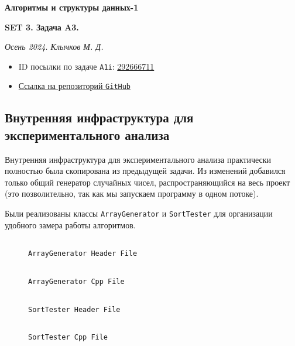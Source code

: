 \documentclass[11pt,a4paper]{scrarticle}
\author{Клычков Максим Дмитриевич}
\theoremstyle{definition}
\begin{document}
\centerline{\textbf{\huge Алгоритмы и структуры данных-1}}
\centerline{\textbf{SET 3. Задача A3.}}
\begin{flushright}
	\emph{Осень 2024. Клычков М. Д.}
\end{flushright}

\begin{itemize}
	\item ID посылки по задаче \texttt{A1i}: \href{https://dsahse.contest.codeforces.com/group/NOflOR1Qt0/contest/565612/submission/292666711}{292666711}
	\item \href{https://github.com/maklybae/algorithms/tree/main/set03/a3}{Ссылка на репозиторий \texttt{GitHub}}
\end{itemize}

\subsection*{Внутренняя инфраструктура для экспериментального анализа}

Внутренняя инфраструктура для экспериментального анализа практически полностью была скопирована из предыдущей задачи. Из изменений добавился только общий генератор случайных чисел, распространяющийся на весь проект (это позволительно, так как мы запускаем программу в одном потоке).

Были реализованы классы \texttt{ArrayGenerator} и \texttt{SortTester} для организации удобного замера работы алгоритмов.

\begin{figure}[htp]
	\centering
	\inputminted[linenos,fontsize=\small]{cpp}{../analyze/generator.h}
	\caption{\texttt{ArrayGenerator Header File}}
	\label{code:generator-h}
\end{figure}
\FloatBarrier

\begin{figure}[htp]
	\centering
	\inputminted[linenos,fontsize=\small]{cpp}{../analyze/generator.cpp}
	\caption{\texttt{ArrayGenerator Cpp File}}
	\label{code:generator-cpp}
\end{figure}
\FloatBarrier

\begin{figure}[htp]
	\centering
	\inputminted[linenos,fontsize=\small]{cpp}{../analyze/tester.h}
	\caption{\texttt{SortTester Header File}}
	\label{code:tester-h}
\end{figure}
\FloatBarrier

\begin{figure}[htp]
	\centering
	\inputminted[linenos,fontsize=\small]{cpp}{../analyze/tester.cpp}
	\caption{\texttt{SortTester Cpp File}}
	\label{code:tester-cpp}
\end{figure}
\FloatBarrier
\end{document}
